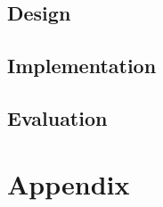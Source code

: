 \chapter{Design}

\chapter{Implementation}

\chapter{Evaluation}

\newpage
\listoftodos
\newpage

\renewcommand{\glsgroupskip}{}
\printglossaries


\printbibliography

\part{Appendix}
\appendix



